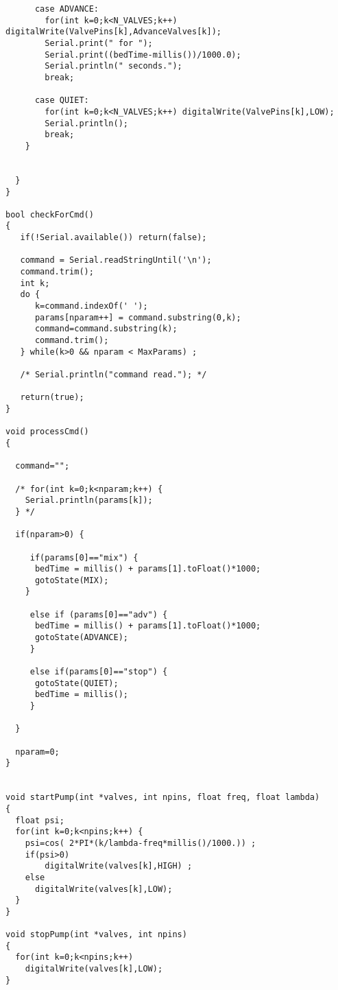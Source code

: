 \begin{lstlisting}
      case ADVANCE:
        for(int k=0;k<N_VALVES;k++) digitalWrite(ValvePins[k],AdvanceValves[k]);
        Serial.print(" for ");
        Serial.print((bedTime-millis())/1000.0);
        Serial.println(" seconds.");
        break;

      case QUIET:
        for(int k=0;k<N_VALVES;k++) digitalWrite(ValvePins[k],LOW);
        Serial.println();
        break;
    }


  }
}

bool checkForCmd()
{
   if(!Serial.available()) return(false);

   command = Serial.readStringUntil('\n');
   command.trim();
   int k;
   do {
      k=command.indexOf(' ');
      params[nparam++] = command.substring(0,k);
      command=command.substring(k);
      command.trim();
   } while(k>0 && nparam < MaxParams) ;

   /* Serial.println("command read."); */

   return(true);
}

void processCmd()
{

  command="";

  /* for(int k=0;k<nparam;k++) {
    Serial.println(params[k]);
  } */

  if(nparam>0) {

     if(params[0]=="mix") {
      bedTime = millis() + params[1].toFloat()*1000;
      gotoState(MIX);
    }

     else if (params[0]=="adv") {
      bedTime = millis() + params[1].toFloat()*1000;
      gotoState(ADVANCE);
     }

     else if(params[0]=="stop") {
      gotoState(QUIET);
      bedTime = millis();
     }

  }

  nparam=0;
}


void startPump(int *valves, int npins, float freq, float lambda)
{
  float psi;
  for(int k=0;k<npins;k++) {
    psi=cos( 2*PI*(k/lambda-freq*millis()/1000.)) ;
    if(psi>0)
        digitalWrite(valves[k],HIGH) ;
    else
      digitalWrite(valves[k],LOW);
  }
}

void stopPump(int *valves, int npins)
{
  for(int k=0;k<npins;k++)
    digitalWrite(valves[k],LOW);
}
\end{lstlisting}
